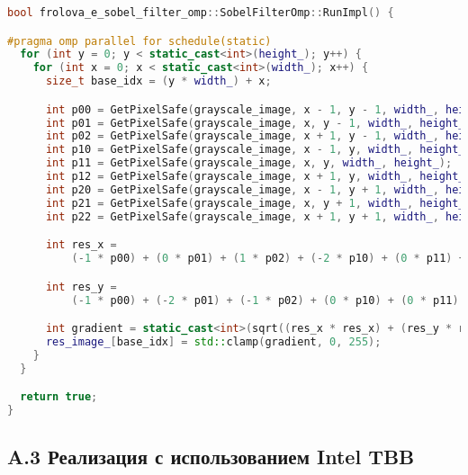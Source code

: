 \documentclass{report}
\begin{document}
\begin{lstlisting}[language=C++,caption={OpenMP Version}]
bool frolova_e_sobel_filter_omp::SobelFilterOmp::RunImpl() {

#pragma omp parallel for schedule(static)
  for (int y = 0; y < static_cast<int>(height_); y++) {
    for (int x = 0; x < static_cast<int>(width_); x++) {
      size_t base_idx = (y * width_) + x;

      int p00 = GetPixelSafe(grayscale_image, x - 1, y - 1, width_, height_);
      int p01 = GetPixelSafe(grayscale_image, x, y - 1, width_, height_);
      int p02 = GetPixelSafe(grayscale_image, x + 1, y - 1, width_, height_);
      int p10 = GetPixelSafe(grayscale_image, x - 1, y, width_, height_);
      int p11 = GetPixelSafe(grayscale_image, x, y, width_, height_);
      int p12 = GetPixelSafe(grayscale_image, x + 1, y, width_, height_);
      int p20 = GetPixelSafe(grayscale_image, x - 1, y + 1, width_, height_);
      int p21 = GetPixelSafe(grayscale_image, x, y + 1, width_, height_);
      int p22 = GetPixelSafe(grayscale_image, x + 1, y + 1, width_, height_);

      int res_x =
          (-1 * p00) + (0 * p01) + (1 * p02) + (-2 * p10) + (0 * p11) + (2 * p12) + (-1 * p20) + (0 * p21) + (1 * p22);

      int res_y =
          (-1 * p00) + (-2 * p01) + (-1 * p02) + (0 * p10) + (0 * p11) + (0 * p12) + (1 * p20) + (2 * p21) + (1 * p22);

      int gradient = static_cast<int>(sqrt((res_x * res_x) + (res_y * res_y)));
      res_image_[base_idx] = std::clamp(gradient, 0, 255);
    }
  }

  return true;
}
\end{lstlisting}

\subsection*{A.3 Реализация с использованием Intel TBB}
\end{document}
